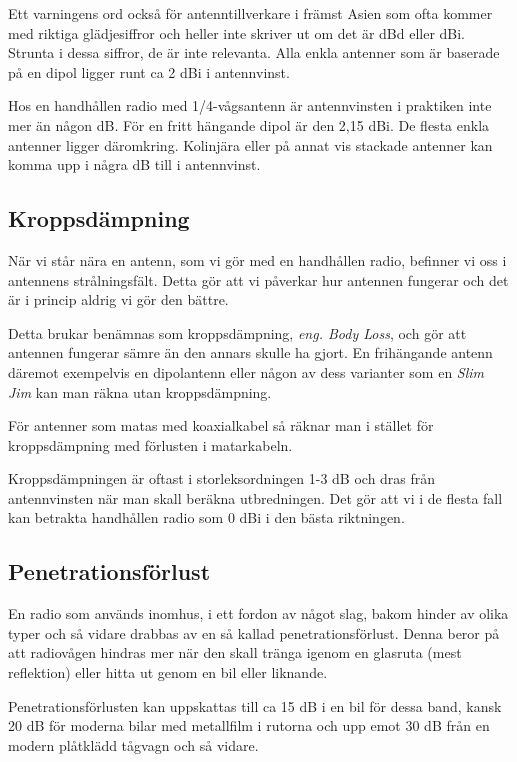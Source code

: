 Ett varningens ord också för antenntillverkare i främst Asien som ofta kommer med riktiga glädjesiffror och heller inte skriver ut om det är dBd eller dBi. Strunta i dessa siffror, de är inte relevanta. Alla enkla antenner som är baserade på en dipol ligger runt ca 2 dBi i antennvinst. 

Hos en handhållen radio med 1/4-vågsantenn är antennvinsten i praktiken inte mer än någon dB. För en fritt hängande dipol är den 2,15 dBi. De flesta enkla antenner ligger däromkring. Kolinjära eller på annat vis stackade antenner kan komma upp i några dB till i antennvinst.

\subsection{Kroppsdämpning}

När vi står nära en antenn, som vi gör med en handhållen radio, befinner vi oss i antennens strålningsfält. Detta gör att vi påverkar hur antennen fungerar och det är i princip aldrig vi gör den bättre. 

Detta brukar benämnas som kroppsdämpning, \textit{eng. Body Loss}, och gör att antennen fungerar sämre än den annars skulle ha gjort. En frihängande antenn däremot exempelvis en dipolantenn eller någon av dess varianter som en \textit{Slim Jim} kan man räkna utan kroppsdämpning.

För antenner som matas med koaxialkabel så räknar man i stället för kroppsdämpning med förlusten i matarkabeln. 

Kroppsdämpningen är oftast i storleksordningen 1-3 dB och dras från antennvinsten när man skall beräkna utbredningen. Det gör att vi i de flesta fall kan betrakta handhållen radio som 0 dBi i den bästa riktningen.

\subsection{Penetrationsförlust}

En radio som används inomhus, i ett fordon av något slag, bakom hinder av olika typer och så vidare drabbas av en så kallad penetrationsförlust. Denna beror på att radiovågen hindras mer när den skall tränga igenom en glasruta (mest reflektion) eller hitta ut genom en bil eller liknande. 

Penetrationsförlusten kan uppskattas till ca 15 dB i en bil för dessa band, kansk 20 dB för moderna bilar med metallfilm i rutorna och upp emot 30 dB från en modern plåtklädd tågvagn och så vidare.

